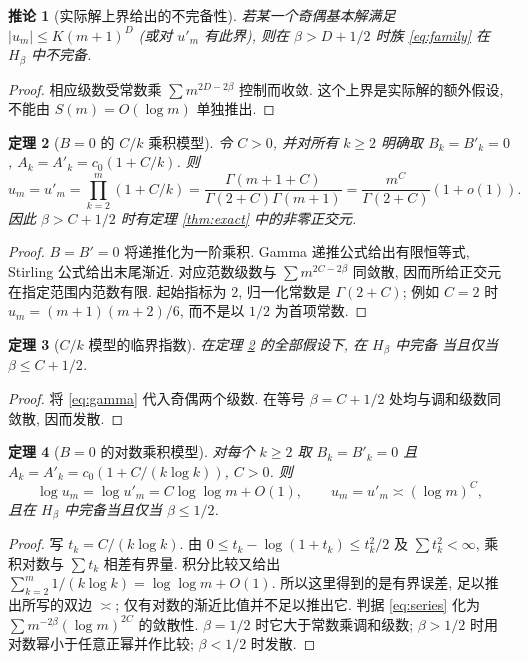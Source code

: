 \documentclass[UTF8]{ctexart}
\newtheorem{theorem}{定理}[section]
\newtheorem{corollary}[theorem]{推论}
\begin{document}
\begin{corollary}[实际解上界给出的不完备性]\label{cor:di}
若某一个奇偶基本解满足 $|u_m|\le K(m+1)^D$ (或对 $u'_m$ 有此界),
则在 $\beta>D+1/2$ 时族 \eqref{eq:family} 在 $H_\beta$ 中不完备.
\end{corollary}
\begin{proof}
相应级数受常数乘 $\sum m^{2D-2\beta}$ 控制而收敛.
这个上界是实际解的额外假设, 不能由 $S(m)=O(\log m)$ 单独推出.
\end{proof}

\begin{theorem}[$B=0$ 的 $C/k$ 乘积模型]\label{thm:sharp}
令 $C>0$, 并对所有 $k\ge2$ 明确取
$B_k=B'_k=0$, $A_k=A'_k=c_0(1+C/k)$.
则
\begin{equation}\label{eq:gamma}
u_m=u'_m=\prod_{k=2}^m(1+C/k)
=\frac{\Gamma(m+1+C)}{\Gamma(2+C)\Gamma(m+1)}
=\frac{m^C}{\Gamma(2+C)}(1+o(1)).
\end{equation}
因此 $\beta>C+1/2$ 时有定理 \ref{thm:exact} 中的非零正交元.
\end{theorem}
\begin{proof}
$B=B'=0$ 将递推化为一阶乘积. Gamma 递推公式给出有限恒等式,
Stirling 公式给出末尾渐近. 对应范数级数与 $\sum m^{2C-2\beta}$
同敛散, 因而所给正交元在指定范围内范数有限.
起始指标为 $2$, 归一化常数是 $\Gamma(2+C)$; 例如 $C=2$ 时
$u_m=(m+1)(m+2)/6$, 而不是以 $1/2$ 为首项常数.
\end{proof}

\begin{theorem}[$C/k$ 模型的临界指数]\label{thm:model}
在定理 \ref{thm:sharp} 的全部假设下, 在 $H_\beta$ 中完备
当且仅当 $\beta\le C+1/2$.
\end{theorem}
\begin{proof}
将 \eqref{eq:gamma} 代入奇偶两个级数.
在等号 $\beta=C+1/2$ 处均与调和级数同敛散, 因而发散.
\end{proof}

\begin{theorem}[$B=0$ 的对数乘积模型]\label{thm:line}
对每个 $k\ge2$ 取 $B_k=B'_k=0$ 且
$A_k=A'_k=c_0(1+C/(k\log k))$, $C>0$.
则
\[
\log u_m=\log u'_m=C\log\log m+O(1),\qquad
u_m=u'_m\asymp(\log m)^C,
\]
且在 $H_\beta$ 中完备当且仅当 $\beta\le1/2$.
\end{theorem}
\begin{proof}
写 $t_k=C/(k\log k)$. 由
$0\le t_k-\log(1+t_k)\le t_k^2/2$ 及 $\sum t_k^2<\infty$,
乘积对数与 $\sum t_k$ 相差有界量.
积分比较又给出 $\sum_{k=2}^m1/(k\log k)=\log\log m+O(1)$.
所以这里得到的是有界误差, 足以推出所写的双边 $\asymp$;
仅有对数的渐近比值并不足以推出它.
判据 \eqref{eq:series} 化为
$\sum m^{-2\beta}(\log m)^{2C}$ 的敛散性.
$\beta=1/2$ 时它大于常数乘调和级数;
$\beta>1/2$ 时用对数幂小于任意正幂并作比较; $\beta<1/2$ 时发散.
\end{proof}
\end{document}
